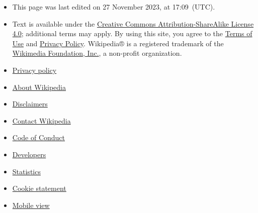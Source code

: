 \documentclass[
]{article}
\providecommand{\tightlist}{%
  \setlength{\itemsep}{0pt}\setlength{\parskip}{0pt}}
\begin{document}
\begin{itemize}
\tightlist
\item
  \label{footer-info-lastmod}{This page was last edited
  on 27 November 2023, at 17:09{~(UTC)}.}
\item
  \label{footer-info-copyright}{Text is available under
  the
  \href{//en.wikipedia.org/wiki/Wikipedia:Text_of_the_Creative_Commons_Attribution-ShareAlike_4.0_International_License}{Creative
  Commons Attribution-ShareAlike License
  4.0}\href{//en.wikipedia.org/wiki/Wikipedia:Text_of_the_Creative_Commons_Attribution-ShareAlike_4.0_International_License}{};
  additional terms may apply. By using this site, you agree to the
  \href{//foundation.wikimedia.org/wiki/Terms_of_Use}{Terms of Use} and
  \href{//foundation.wikimedia.org/wiki/Privacy_policy}{Privacy Policy}.
  Wikipedia® is a registered trademark of the
  \href{//www.wikimediafoundation.org/}{Wikimedia Foundation, Inc.}, a
  non-profit organization.}
\end{itemize}

\begin{itemize}
\tightlist
\item
  \label{footer-places-privacy}{\href{https://foundation.wikimedia.org/wiki/Special:MyLanguage/Policy:Privacy_policy}{Privacy
  policy}}
\item
  \label{footer-places-about}{\href{/wiki/Wikipedia:About}{About
  Wikipedia}}
\item
  \label{footer-places-disclaimers}{\href{/wiki/Wikipedia:General_disclaimer}{Disclaimers}}
\item
  \label{footer-places-contact}{\href{//en.wikipedia.org/wiki/Wikipedia:Contact_us}{Contact
  Wikipedia}}
\item
  \label{footer-places-wm-codeofconduct}{\href{https://foundation.wikimedia.org/wiki/Special:MyLanguage/Policy:Universal_Code_of_Conduct}{Code
  of Conduct}}
\item
  \label{footer-places-developers}{\href{https://developer.wikimedia.org}{Developers}}
\item
  \label{footer-places-statslink}{\href{https://stats.wikimedia.org/\#/en.wikipedia.org}{Statistics}}
\item
  \label{footer-places-cookiestatement}{\href{https://foundation.wikimedia.org/wiki/Special:MyLanguage/Policy:Cookie_statement}{Cookie
  statement}}
\item
  \label{footer-places-mobileview}{\href{//en.m.wikipedia.org/w/index.php?title=Joule&mobileaction=toggle_view_mobile}{Mobile
  view}}
\end{itemize}
\end{document}
